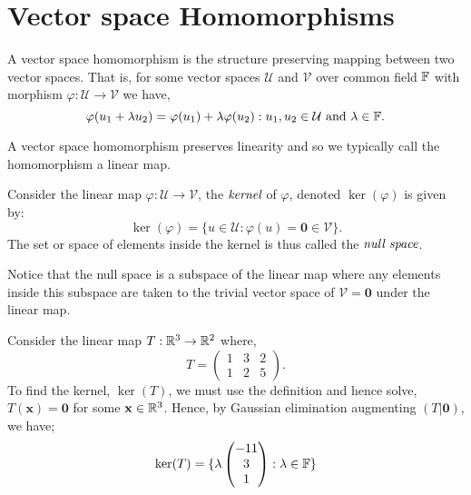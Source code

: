 
\section{Vector space Homomorphisms} %
\label{sec:linearmaps}

\begin{defn}
	A vector space homomorphism is the structure preserving mapping between two vector spaces.
	That is, for some vector spaces $\mathcal{U}$ and $\mathcal{V}$ over common field $\mathbb{F}$
	with morphism $\varphi : \mathcal{U} \to \mathcal{V}$ we have,
	\[
		\varphi(u_1 + \lambda u_2) = \varphi(u_1) + \lambda \varphi(u_2) : u_1,u_2 \in \mathcal{U} \text{ and } \lambda \in \mathbb{F}.
	\]
\end{defn}

\begin{rem}
	A vector space homomorphism preserves linearity and so we typically call the
	homomorphism a linear map.
\end{rem}

\begin{defn}[Kernel]
	Consider the linear map $\varphi : \mathcal{U} \to \mathcal{V}$, the
	$\emph{kernel}$ of $\varphi$, denoted $\ker(\varphi)$ is given by:
	\[
		\ker(\varphi) = \{ u \in \mathcal{U} : \varphi(u) = \mathbf{0} \in \mathcal{V} \}.
	\]
	The set or space of elements inside the kernel is thus called the $\emph{null space}$.
\end{defn}

Notice that the null space is a subspace of the linear map where any elements inside this
subspace are taken to the trivial vector space of $\mathcal{V} = \mathbf{0}$ under the linear
map.

\begin{exmp}
	Consider the linear map $T:\mathbb{R}^3 \to \mathbb{R}^2$ where,
	\[
		T=
		\begin{pmatrix}
			1 & 3 & 2 \\
			1 & 2 & 5 
		\end{pmatrix}.
	\]
	To find the kernel, $\ker(T)$, we must use the definition and hence solve,
	$T(\mathbf{x}) = \mathbf{0}$ for some $\mathbf{x} \in \mathbb{R}^3$. Hence, by Gaussian
	elimination augmenting $(T | \mathbf{0})$, we have;
	\[
		\ker(T) = \{ \lambda \begin{pmatrix} -11 \\ 3 \\ 1 \end{pmatrix} : \lambda \in \mathbb{F} \}
	\]
\end{exmp}

